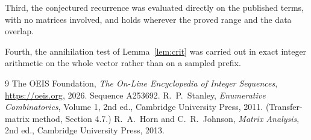 \documentclass[11pt,a4paper]{article}
\theoremstyle{plain}
\theoremstyle{definition}
\begin{document}
Third, the conjectured recurrence was evaluated directly on the published terms, with no
matrices involved, and holds wherever the proved range and the data overlap.

Fourth, the annihilation test of Lemma~\ref{lem:crit} was carried out in exact integer
arithmetic on the whole vector rather than on a sampled prefix.

\begin{thebibliography}{9}
 The OEIS Foundation, \emph{The On-Line Encyclopedia of Integer
Sequences}, \url{https://oeis.org}, 2026. Sequence A253692.
 R.~P.~Stanley, \emph{Enumerative Combinatorics}, Volume 1, 2nd ed.,
Cambridge University Press, 2011. (Transfer-matrix method, Section 4.7.)
 R.~A.~Horn and C.~R.~Johnson, \emph{Matrix Analysis}, 2nd ed., Cambridge
University Press, 2013.
\end{thebibliography}
\end{document}
